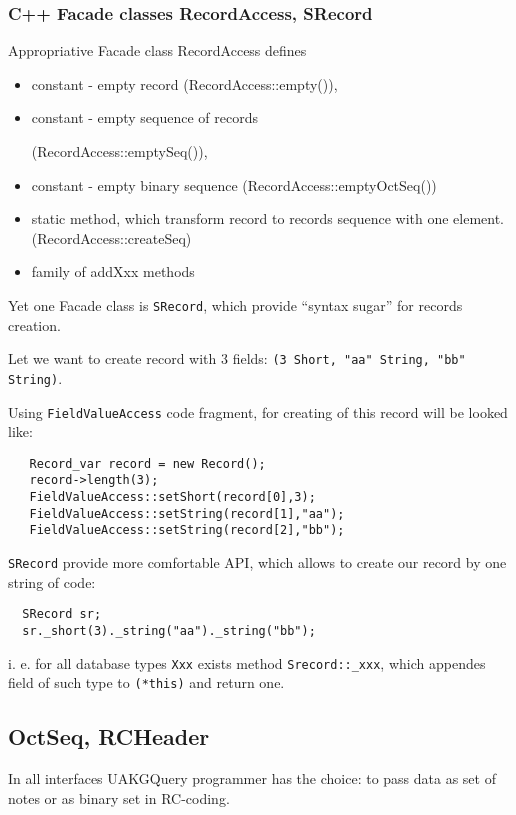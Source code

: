 \documentclass[10pt]{article}
\begin{document}
\subsubsection{ C++ Facade classes RecordAccess, SRecord } 

  Appropriative Facade class RecordAccess defines
  \begin{itemize} 
    \item constant - empty record 
          (RecordAccess::empty()), 
    \item constant - empty sequence of records 

  (RecordAccess::emptySeq()), 
    \item constant - empty binary sequence (RecordAccess::emptyOctSeq())
    \item static method,
  which transform record to records sequence with one element.
    (RecordAccess::createSeq)
    \item family of addXxx methods
  \end{itemize} 

  Yet one Facade class is \verb|SRecord|, which provide ``syntax sugar''
  for records creation.

  Let we want to create record with 3 fields:
    \verb|(3 Short, "aa" String, "bb" String)|.

  Using \verb|FieldValueAccess| code fragment, for creating of this record
 will be looked like:
 \begin{verbatim}
   Record_var record = new Record();
   record->length(3);
   FieldValueAccess::setShort(record[0],3);
   FieldValueAccess::setString(record[1],"aa");
   FieldValueAccess::setString(record[2],"bb");
 \end{verbatim}

 \verb|SRecord| provide more comfortable API, which allows to create our record by one string of code:
\begin{verbatim}
  SRecord sr;
  sr._short(3)._string("aa")._string("bb");
\end{verbatim}

 i. e. for all database types \verb|Xxx| exists method  \verb|Srecord::_xxx|,
 which appendes field of such type to \verb|(*this)| and return one.

\subsection{ OctSeq, RCHeader }

In all interfaces UAKGQuery programmer has the choice: to pass data as set of notes or as binary set in RC-coding.
 
\end{document}
